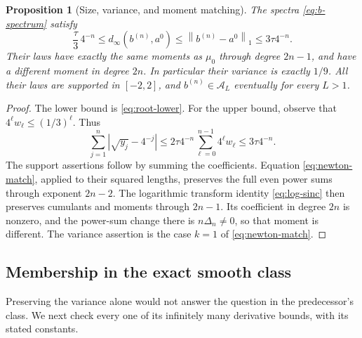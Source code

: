 \documentclass[11pt,a4paper]{article}
\numberwithin{equation}{section}
\newtheorem{proposition}[theorem]{Proposition}
\theoremstyle{definition}
\theoremstyle{remark}
\newcommand{\A}{\mathcal A}
\newcommand{\norm}[1]{\left\lVert #1\right\rVert}
\begin{document}
\begin{proposition}[Size, variance, and moment matching]
\label{prop:construction-size}
The spectra \eqref{eq:b-spectrum} satisfy
\begin{equation}
 \frac\tau3\,4^{-n}
 \le d_\infty(b^{(n)},a^0)
 \le\norm{b^{(n)}-a^0}_1
 \le3\tau4^{-n}.
 \label{eq:b-gap}
\end{equation}
Their laws have exactly the same moments as $\mu_0$ through degree $2n-1$,
and have a different moment in degree $2n$. In particular their variance is
exactly $1/9$. All their laws are supported in $[-2,2]$, and
$b^{(n)}\in\A_L$ eventually for every $L>1$.
\end{proposition}
\begin{proof}
The lower bound is \eqref{eq:root-lower}. For the upper bound, observe that
$4^\ell w_\ell\le(1/3)^\ell$. Thus
\[
 \sum_{j=1}^n|\sqrt{y_j}-4^{-j}|
 \le2\tau4^{-n}\sum_{\ell=0}^{n-1}4^\ell w_\ell
 \le3\tau4^{-n}.
\]
The support assertions follow by summing the coefficients.
Equation \eqref{eq:newton-match}, applied to their squared lengths, preserves
the full even power sums through exponent $2n-2$. The logarithmic transform
identity \eqref{eq:log-sinc} then preserves cumulants and moments through
$2n-1$. Its coefficient in degree $2n$ is nonzero, and the power-sum change
there is $n\Delta_n\ne0$, so that moment is different. The variance assertion
is the case $k=1$ of \eqref{eq:newton-match}.
\end{proof}

\subsection{Membership in the exact smooth class}

Preserving the variance alone would not answer the question in the
predecessor's class. We next check every one of its infinitely many derivative
bounds, with its stated constants.
\end{document}
